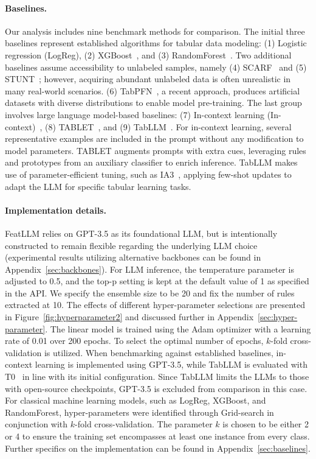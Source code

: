 \vspace*{-0.12in}
\paragraph{Baselines.}
Our analysis includes nine benchmark methods for comparison. The initial three baselines represent established algorithms for tabular data modeling: (1) Logistic regression (LogReg), (2) XGBoost~\cite{chen2016xgboost}, and (3) RandomForest~\cite{ho1995random}. Two additional baselines assume accessibility to unlabeled samples, namely (4) SCARF~\cite{bahri2022scarf} and (5) STUNT~\cite{nam2023stunt}; however, acquiring abundant unlabeled data is often unrealistic in many real-world scenarios. (6) TabPFN~\cite{hollmann2022tabpfn}, a recent approach, produces artificial datasets with diverse distributions to enable model pre-training. The last group involves large language model-based baselines: (7) In-context learning (In-context)~\cite{wei2022emergent}, (8) TABLET~\cite{slack2023tablet}, and (9) TabLLM~\cite{hegselmann2023tabllm}. For in-context learning, several representative examples are included in the prompt without any modification to model parameters. TABLET augments prompts with extra cues, leveraging rules and prototypes from an auxiliary classifier to enrich inference. TabLLM makes use of parameter-efficient tuning, such as IA3~\cite{liu2022few}, applying few-shot updates to adapt the LLM for specific tabular learning tasks.

\vspace*{-0.12in}
\paragraph{Implementation details.}
\textsf{FeatLLM} relies on GPT-3.5 as its foundational LLM, but is intentionally constructed to remain flexible regarding the underlying LLM choice (experimental results utilizing alternative backbones can be found in Appendix~\ref{sec:backbones}). For LLM inference, the temperature parameter is adjusted to 0.5, and the top-p setting is kept at the default value of 1 as specified in the API. We specify the ensemble size to be 20 and fix the number of rules extracted at 10. The effects of different hyper-parameter selections are presented in Figure~\ref{fig:hyperparameter2} and discussed further in Appendix~\ref{sec:hyper-parameter}.
The linear model is trained using the Adam optimizer with a learning rate of 0.01 over 200 epochs. To select the optimal number of epochs, $k$-fold cross-validation is utilized. When benchmarking against established baselines, in-context learning is implemented using GPT-3.5, while TabLLM is evaluated with T0~\cite{sanh2022multitask} in line with its initial configuration. Since TabLLM limits the LLMs to those with open-source checkpoints, GPT-3.5 is excluded from comparison in this case. For classical machine learning models, such as LogReg, XGBoost, and RandomForest, hyper-parameters were identified through Grid-search in conjunction with $k$-fold cross-validation. The parameter $k$ is chosen to be either 2 or 4 to ensure the training set encompasses at least one instance from every class. Further specifics on the implementation can be found in Appendix~\ref{sec:baselines}.

